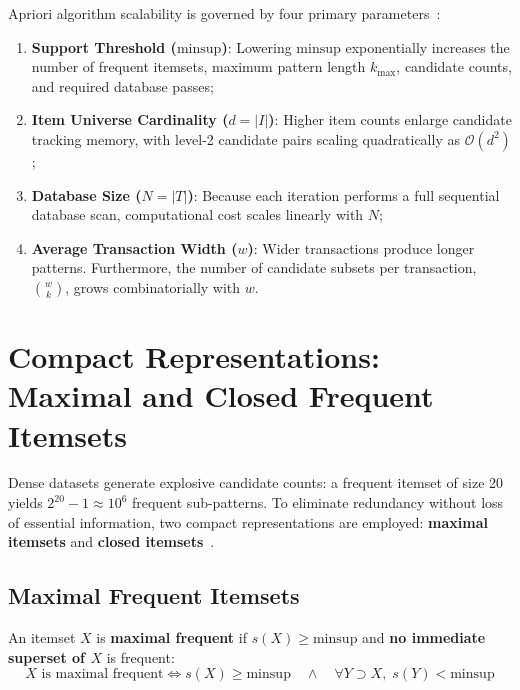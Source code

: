 Apriori algorithm scalability is governed by four primary parameters~\cite{tan2018}:
\begin{enumerate}
    \item \textbf{Support Threshold ($\mathrm{minsup}$)}: Lowering $\mathrm{minsup}$ exponentially increases the number of frequent itemsets, maximum pattern length $k_{\max}$, candidate counts, and required database passes;
    \item \textbf{Item Universe Cardinality ($d = |I|$)}: Higher item counts enlarge candidate tracking memory, with level-2 candidate pairs scaling quadratically as $\mathcal{O}(d^2)$;
    \item \textbf{Database Size ($N = |T|$)}: Because each iteration performs a full sequential database scan, computational cost scales linearly with $N$;
    \item \textbf{Average Transaction Width ($w$)}: Wider transactions produce longer patterns. Furthermore, the number of candidate subsets per transaction, $\binom{w}{k}$, grows combinatorially with $w$.
\end{enumerate}

\section[Compact Representations: Maximal and Closed Itemsets]{Compact Representations:\\Maximal and Closed Frequent Itemsets}
\label{sec:dm-maximal-closed-itemsets}

Dense datasets generate explosive candidate counts: a frequent itemset of size 20 yields $2^{20} - 1 \approx 10^6$ frequent sub-patterns. To eliminate redundancy without loss of essential information, two compact representations are employed: \textbf{maximal itemsets} and \textbf{closed itemsets}~\cite{tan2018}.

\subsection{Maximal Frequent Itemsets}

\begin{definition}
An itemset $X$ is \textbf{maximal frequent} if $s(X) \ge \mathrm{minsup}$ and \textbf{no immediate superset of $X$} is frequent:
\begin{equation}
\label{eq:dm-maximal-frequent-def-en}
X \text{ is maximal frequent} \Longleftrightarrow s(X) \ge \mathrm{minsup} \quad \land \quad \forall Y \supset X, \; s(Y) < \mathrm{minsup}
\end{equation}
\end{definition}


